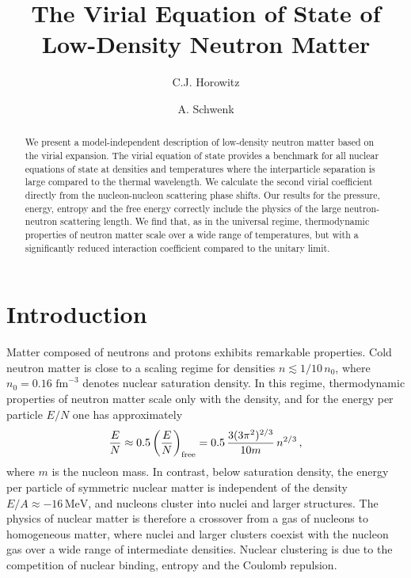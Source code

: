 \documentclass[aps,prc,twocolumn,showpacs,showkeys,amsmath,amssymb]{revtex4}
\newcommand{\be}{\begin{equation}}
\newcommand{\ee}{\end{equation}}
\newcommand{\fm}{\, \text{fm}}
\newcommand{\mev}{\, \text{MeV}}
\begin{document}
\title{The Virial Equation of State of Low-Density Neutron Matter}
\author{C.J. Horowitz}
\author{A. Schwenk}

\begin{abstract}
We present a model-independent description of low-density neutron matter
based on the virial expansion. The virial equation of state provides a
benchmark for all nuclear equations of state at densities
and temperatures where the interparticle separation is large compared 
to the thermal wavelength. We calculate the second virial coefficient 
directly from the nucleon-nucleon scattering phase shifts. Our results 
for the pressure, energy, entropy and the free energy correctly include
the physics of the large neutron-neutron scattering length. We find that, as 
in the universal regime, thermodynamic properties of neutron matter 
scale over a wide range of temperatures, but with a significantly reduced 
interaction coefficient compared to the unitary limit.
\end{abstract}


\maketitle

\section{Introduction}

Matter composed of neutrons and protons exhibits remarkable properties.
Cold neutron matter is close to a scaling regime for densities $n 
\lesssim 1/10 \, n_0$, where $n_0 = 0.16 \, \fm^{-3}$ denotes nuclear 
saturation density.
In this regime, thermodynamic properties of neutron matter scale only with 
the density, and for the energy per particle $E/N$ one has
approximately~\cite{Vijay,dEFT}
\be
\frac{E}{N} \approx 0.5 \, \biggl( \frac{E}{N} \biggr)_{\rm free} = 0.5 \,
\frac{3 (3 \pi^2)^{2/3}}{10 m} \, n^{2/3} \,,
\label{coldneut}
\ee
where $m$ is the nucleon mass.
In contrast, below saturation density, the energy per particle of symmetric 
nuclear matter is independent of the density $E/A \approx -16 \mev$, and 
nucleons cluster into nuclei and larger structures. The physics of nuclear 
matter is therefore a crossover from a gas of nucleons to homogeneous matter,
where nuclei and larger clusters coexist with the nucleon gas over a wide 
range of intermediate densities.
Nuclear clustering is due to the competition of nuclear binding, entropy and
the Coulomb repulsion.
\end{document}
